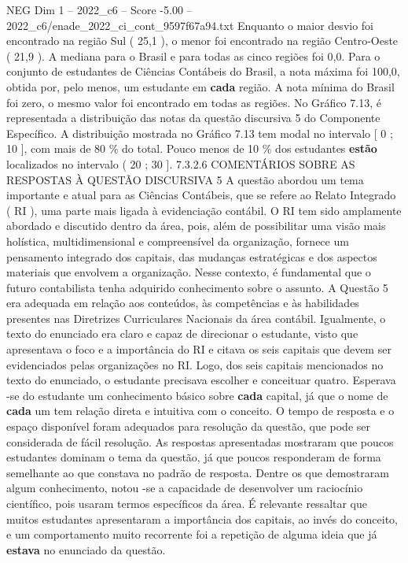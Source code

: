 \begin{textsample}{NEG Dim 1 – 2022\_c6 – Score -5.00 – 2022\_c6/enade\_2022\_ci\_cont\_9597f67a94.txt}
Enquanto o maior desvio foi encontrado na região Sul ( 25,1 ), o menor foi encontrado na região Centro-Oeste ( 21,9 ).
A mediana para o Brasil e para todas as cinco regiões foi 0,0.
Para o conjunto de estudantes de Ciências Contábeis do Brasil, a nota máxima foi 100,0, obtida por, pelo menos, um estudante em \textbf{cada} região.
A nota mínima do Brasil foi zero, o mesmo valor foi encontrado em todas as regiões.
No Gráfico 7.13, é representada a distribuição das notas da questão discursiva 5 do Componente Específico.
A distribuição mostrada no Gráfico 7.13 tem modal no intervalo [ 0 ; 10 ], com mais de 80 \% do total.
Pouco menos de 10 \% dos estudantes \textbf{estão} localizados no intervalo ( 20 ; 30 ]. 7.3.2.6 COMENTÁRIOS SOBRE AS RESPOSTAS À QUESTÃO DISCURSIVA 5 A questão abordou um tema importante e atual para as Ciências Contábeis, que se refere ao Relato Integrado ( RI ), uma parte mais ligada à evidenciação contábil.
O RI tem sido amplamente abordado e discutido dentro da área, pois, além de possibilitar uma visão mais holística, multidimensional e compreensível da organização, fornece um pensamento integrado dos capitais, das mudanças estratégicas e dos aspectos materiais que envolvem a organização.
Nesse contexto, é fundamental que o futuro contabilista tenha adquirido conhecimento sobre o assunto.
A Questão 5 era adequada em relação aos conteúdos, às competências e às habilidades presentes nas Diretrizes Curriculares Nacionais da área contábil.
Igualmente, o texto do enunciado era claro e capaz de direcionar o estudante, visto que apresentava o foco e a importância do RI e citava os seis capitais que devem ser evidenciados pelas organizações no RI.
Logo, dos seis capitais mencionados no texto do enunciado, o estudante precisava escolher e conceituar quatro.
Esperava -se do estudante um conhecimento básico sobre \textbf{cada} capital, já que o nome de \textbf{cada} um tem relação direta e intuitiva com o conceito.
O tempo de resposta e o espaço disponível foram adequados para resolução da questão, que pode ser considerada de fácil resolução.
As respostas apresentadas mostraram que poucos estudantes dominam o tema da questão, já que poucos responderam de forma semelhante ao que constava no padrão de resposta.
Dentre os que demostraram algum conhecimento, notou -se a capacidade de desenvolver um raciocínio científico, pois usaram termos específicos da área.
É relevante ressaltar que muitos estudantes apresentaram a importância dos capitais, ao invés do conceito, e um comportamento muito recorrente foi a repetição de alguma ideia que já \textbf{estava} no enunciado da questão.

\end{textsample}
